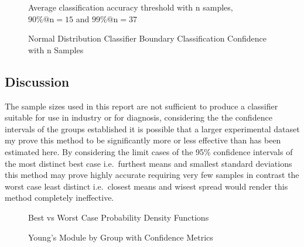 \documentclass[
  paper=a4,
  ,captions=tableheading
]{scrartcl}
\makeatletter
\newcommand*\pandocbounded[1]{%
  \sbox\pandoc@box{#1}%
  \Gscale@div\@tempa{\textheight}{\dimexpr\ht\pandoc@box+\dp\pandoc@box\relax}%
  \Gscale@div\@tempb{\linewidth}{\wd\pandoc@box}%
  \ifdim\@tempb\p@<\@tempa\p@\let\@tempa\@tempb\fi%
  \ifdim\@tempa\p@<\p@\scalebox{\@tempa}{\usebox\pandoc@box}%
  \else\usebox{\pandoc@box}%
  \fi%
}
\makeatother
\begin{document}
\noindent
\begin{minipage}[t]{0.48\textwidth}
\begin{figure}
\centering
\pandocbounded{}
\caption{Average classification accuracy threshold with n samples,
\(90 \% @ \text{n}=15\) and \(99 \% @ \text{n}=37\)}
\end{figure}
\end{minipage}
\hfill
\begin{minipage}[t]{0.48\textwidth}
\begin{figure}
\centering
\pandocbounded{}
\caption{Normal Distribution Classifier Boundary Classification
Confidence with n Samples}
\end{figure}
\end{minipage}

\subsection{Discussion}\label{discussion}

The sample sizes used in this report are not sufficient to produce a
classifier suitable for use in industry or for diagnosis, considering
the the confidence intervals of the groups established it is possible
that a larger experimental dataset my prove this method to be
significantly more or less effective than has been estimated here. By
considering the limit cases of the 95\% confidence intervals of the most
distinct best case i.e.~furthest means and smallest standard deviations
this method may prove highly accurate requiring very few samples in
contrast the worst case least distinct i.e.~closest means and wisest
spread would render this method completely ineffective.

\noindent
\begin{minipage}[t]{0.48\textwidth}
\begin{figure}
\centering
\pandocbounded{}
\caption{Best vs Worst Case Probability Density Functions}
\end{figure}
\end{minipage}
\hfill
\begin{minipage}[t]{0.48\textwidth}
\begin{figure}
\centering
\pandocbounded{}
\caption{Young's Module by Group with Confidence Metrics}
\end{figure}
\end{minipage}
\end{document}

